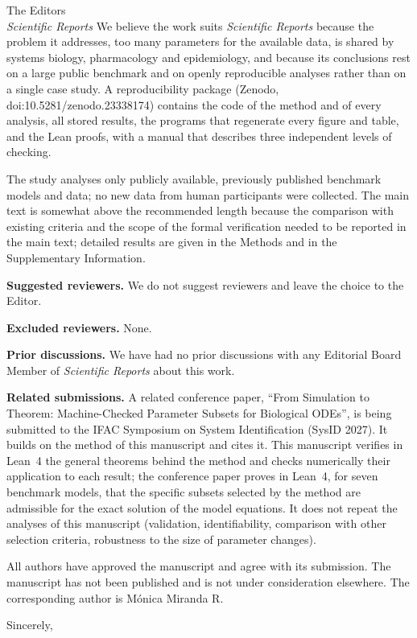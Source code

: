 \documentclass[11pt]{letter}
\begin{document}
\begin{letter}{The Editors\\\emph{Scientific Reports}}
We believe the work suits \emph{Scientific Reports} because the problem it addresses, too many parameters for the available data, is shared by systems biology, pharmacology and epidemiology, and because its conclusions rest on a large public benchmark and on openly reproducible analyses rather than on a single case study. A reproducibility package (Zenodo, doi:10.5281/zenodo.23338174) contains the code of the method and of every analysis, all stored results, the programs that regenerate every figure and table, and the Lean proofs, with a manual that describes three independent levels of checking.

The study analyses only publicly available, previously published benchmark models and data; no new data from human participants were collected. The main text is somewhat above the recommended length because the comparison with existing criteria and the scope of the formal verification needed to be reported in the main text; detailed results are given in the Methods and in the Supplementary Information.

\textbf{Suggested reviewers.} We do not suggest reviewers and leave the choice to the Editor.

\textbf{Excluded reviewers.} None.

\textbf{Prior discussions.} We have had no prior discussions with any Editorial Board Member of \emph{Scientific Reports} about this work.

\textbf{Related submissions.} A related conference paper, ``From Simulation to Theorem: Machine-Checked Parameter Subsets for Biological ODEs'', is being submitted to the IFAC Symposium on System Identification (SysID 2027). It builds on the method of this manuscript and cites it. This manuscript verifies in Lean~4 the general theorems behind the method and checks numerically their application to each result; the conference paper proves in Lean~4, for seven benchmark models, that the specific subsets selected by the method are admissible for the exact solution of the model equations. It does not repeat the analyses of this manuscript (validation, identifiability, comparison with other selection criteria, robustness to the size of parameter changes).

All authors have approved the manuscript and agree with its submission. The manuscript has not been published and is not under consideration elsewhere. The corresponding author is M\'onica Miranda R.

\setlength{\longindentation}{0pt}\setlength{\indentedwidth}{\textwidth}
\closing{Sincerely,}

\end{letter}
\end{document}
